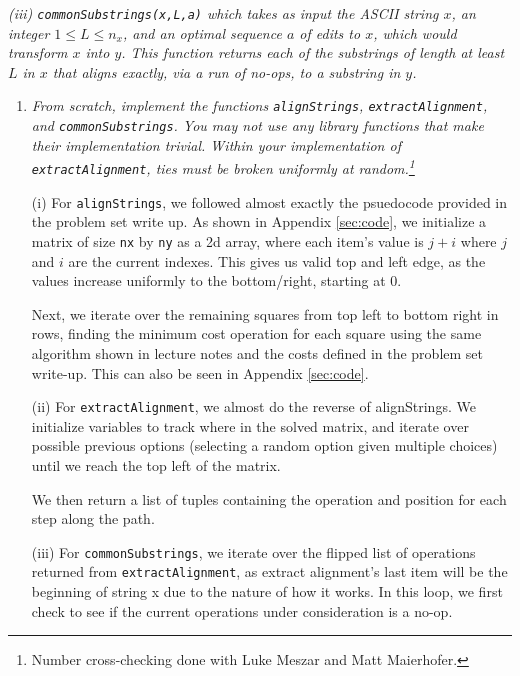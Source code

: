 \documentclass[12pt]{article}
\begin{document}
\begin{enumerate}
    	\textit{(iii) {\tt commonSubstrings(x,L,a)} which takes as input the ASCII string $x$, an integer $1\leq L \leq n_{x}$, and an optimal sequence $a$ of edits to $x$, which would transform $x$ into $y$. This function returns each of the substrings of length at least $L$ in $x$ that aligns exactly, via a run of no-ops, to a substring in $y$.}
    
    	\begin{enumerate}
    
        	\item \textit{From scratch, implement the functions {\tt alignStrings}, {\tt extractAlignment}, and {\tt commonSubstrings}. You may not use any library functions that make their implementation trivial. Within your implementation of {\tt extractAlignment}, ties must be broken uniformly at random.\footnote{Number cross-checking done with Luke Meszar and Matt Maierhofer.}}
        	
            (i) For \texttt{alignStrings}, we followed almost exactly the psuedocode provided in the problem set write up. As shown in Appendix \ref{sec:code}, we initialize a matrix of size \texttt{nx} by \texttt{ny} as a 2d array, where each item's value is $j+i$ where $j$ and $i$ are the current indexes. This gives us valid top and left edge, as the values increase uniformly to the bottom/right, starting at 0. 
            
            Next, we iterate over the remaining squares from top left to bottom right in rows, finding the minimum cost operation for each square using the same algorithm shown in lecture notes and the costs defined in the problem set write-up. This can also be seen in Appendix \ref{sec:code}.
            
            (ii) For \texttt{extractAlignment}, we almost do the reverse of alignStrings. We initialize variables to track where in the solved matrix, and iterate over possible previous options (selecting a random option given multiple choices) until we reach the top left of the matrix. 
            
            We then return a list of tuples containing the operation and position for each step along the path.
            
            (iii) For {\tt commonSubstrings}, we iterate over the flipped list of operations returned from {\tt extractAlignment}, as extract alignment's last item will be the beginning of string x due to the nature of how it works. In this loop, we first check to see if the current operations under consideration is a no-op.
            

\end{enumerate}
\end{enumerate}
\end{document}
